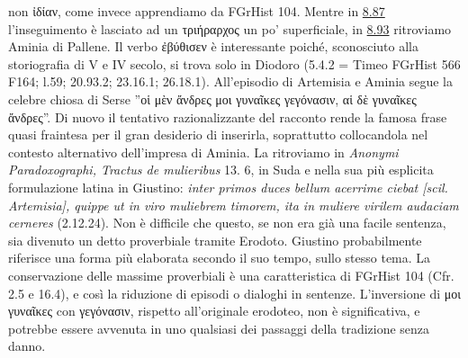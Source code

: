 {non \textgreek{ἰδίαν}, come invece apprendiamo da FGrHist 104. Mentre in \href{http://data.perseus.org/citations/urn:cts:greekLit:tlg0016.tlg001.perseus-grc1:8.87}{8.87} l'inseguimento è lasciato ad un \textgreek{τριήραρχος} un po' superficiale, in \href{http://data.perseus.org/citations/urn:cts:greekLit:tlg0016.tlg001.perseus-grc1:8.93}{8.93} ritroviamo Aminia di Pallene. Il verbo \textgreek{ἐβύθισεν} è interessante poiché, sconosciuto alla storiografia di V e IV secolo, si trova solo in  Diodoro (5.4.2 = Timeo FGrHist 566 F164; l.59; 20.93.2; 23.16.1; 26.18.1). All'episodio di Artemisia e Aminia segue la celebre chiosa di Serse ''\textgreek{οἱ μὲν ἄνδρες μοι γυναῖκες γεγόνασιν, αἱ δὲ γυναῖκες ἄνδρες}''. Di nuovo il tentativo razionalizzante del racconto rende la famosa frase quasi fraintesa per il gran desiderio di inserirla, soprattutto collocandola nel contesto alternativo dell'impresa di Aminia. La ritroviamo in\emph{ Anonymi Paradoxographi, Tractus de mulieribus} 13. 6, in Suda e nella sua più esplicita formulazione latina in Giustino:  \emph{inter primos duces bellum acerrime ciebat [scil. Artemisia], quippe ut in viro muliebrem timorem, ita in muliere virilem audaciam cerneres} (2.12.24). Non è difficile che questo, se non era già una facile sentenza, sia divenuto un detto proverbiale tramite Erodoto.  Giustino probabilmente riferisce una forma più elaborata secondo il suo tempo, sullo stesso tema.  La conservazione delle massime proverbiali è una caratteristica di FGrHist 104 (Cfr. 2.5 e 16.4), e così la riduzione di episodi o dialoghi in sentenze. L'inversione di \textgreek{μοι γυναῖκες} con \textgreek{γεγόνασιν}, rispetto all'originale erodoteo, non è significativa, e potrebbe essere avvenuta in uno qualsiasi dei passaggi della tradizione senza danno.
}
